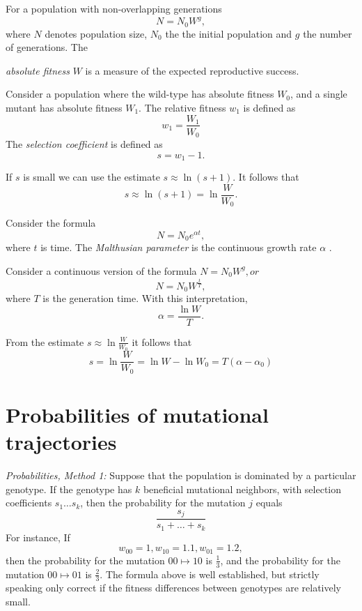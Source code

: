 \documentclass[12pt]{amsart}
\theoremstyle{plain}
\theoremstyle{definition}
\begin{document}
For a population
with non-overlapping generations
\[ 
N=N_0  W^g,
\]
where $N$ denotes population size, $N_0$ the 
the initial population and
$g$ the number of generations.
The {{\emph{absolute fitness}}
$W$ is a measure of the expected reproductive success.


Consider a population where
the wild-type has
absolute fitness $W_0$,
and a single mutant has 
absolute fitness $W_1$.
The relative fitness $w_1$
is defined as
\[
w_1=\frac{W_1}{W_0}
\]
 The
{\emph{selection coefficient}} is
defined as 
\[
s=w_1-1.
\]

If $s$ is small we can use the estimate
$s \approx \ln(s+1)$. It follows that
\[
s\approx \ln(s+1)=\ln \frac{W}{W_0} .
\]


Consider the formula
\[
N=N_0  e^{\alpha t},
\]
where $t$ is time.  
The {\emph{ Malthusian
parameter}} is the continuous growth
rate $\alpha$ .

\bigskip
Consider a continuous version of the formula 
$
N=N_0  W^g, or
$
\[ 
N=N_0  W^{\frac{t}{T}},
\]
where $T$ is the generation time.
With this interpretation,
\[
\alpha=\frac{\ln W }{T}.
\]


From the estimate
$
s \approx \ln \frac{W}{W_0} 
$
it follows that
\[
s=\ln \frac{W}{W_0} =\ln W- \ln W_0=T(\alpha-\alpha_0)
\]











\section{Probabilities of mutational trajectories}
{\emph{Probabilities, Method 1:}}
Suppose that the population is dominated
by a particular genotype.
If the genotype has $k$ beneficial mutational neighbors,
with selection coefficients $s_1 \dots s_k$,
then the probability for the mutation $j$ 
equals
\[
\frac{s_j}{s_1+ \dots + s_k}
\]
For instance,
If 
\[
w_{00}=1, w_{10}=1.1, w_{01}=1.2,
\]
then the probability for
the mutation $00 \mapsto 10$
is $\frac{1}{3}$,
and the probability for
the mutation $00 \mapsto 01$
is $\frac{2}{3}$.
The formula above is well established,
but strictly speaking only correct
if the fitness differences between
genotypes are relatively small.



}
\end{document}

